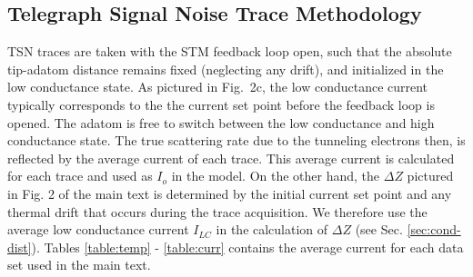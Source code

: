 \documentclass[reprint,amsmath,amssymb,aps,nofootinbib,onecolumn]{revtex4-2}
\begin{document}
\subsection{Telegraph Signal Noise Trace Methodology}
TSN traces are taken with the STM feedback loop open, such that the absolute tip-adatom distance remains fixed (neglecting any drift), and initialized in the low conductance state. As pictured in Fig.~2c, the low conductance current typically corresponds to the the current set point before the feedback loop is opened. The adatom is free to switch between the low conductance and high conductance state. The true scattering rate due to the tunneling electrons then, is reflected by the average current of each trace. This average current is calculated for each trace and used as $I_o$ in the model. On the other hand, the $\Delta Z$ pictured in Fig. 2 of the main text is determined by the initial current set point and any thermal drift that occurs during the trace acquisition. We therefore use the average low conductance current $I_{LC}$ in the calculation of $\Delta Z$ (see Sec. \ref{sec:cond-dist}). Tables \ref{table:temp} - \ref{table:curr} contains the average current for each data set used in the main text.  
\end{document}
